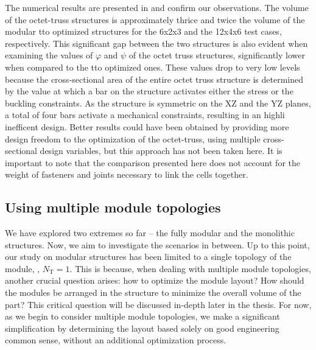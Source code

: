 The numerical results are presented in  and confirm our observations. The volume of the octet-truss structures is approximately thrice and twice the volume of the modular \gls{tto} optimized structures for the 6x2x3 and the 12x4x6 test cases, respectively. This significant gap between the two structures is also evident when examining the values of $\varphi$ and $\psi$ of the octet truss structures, significantly lower when compared to the \gls{tto} optimized ones. These values drop to very low levels because the cross-sectional area of the entire octet truss structure is determined by the value at which a bar on the structure activates either the stress or the buckling constraints. As the structure is symmetric on the XZ and the YZ planes, a total of four bars activate a mechanical constraints, resulting in an highli inefficent design. Better results could have been obtained by providing more design freedom to the optimization of the octet-truss, using multiple cross-sectional design variables, but this approach has not been taken here. It is important to note that the comparison presented here does not account for the weight of fasteners and joints necessary to link the cells together.

\subsection{Using multiple module topologies}
We have explored two extremes so far -- the fully modular and the monolithic structures. Now, we aim to investigate the scenarios in between. Up to this point, our study on modular structures has been limited to a single topology of the module, \ie, $N_\text{T}=1$. This is because, when dealing with multiple module topologies, another crucial question arises: how to optimize the module layout? How should the modules be arranged in the structure to minimize the overall volume of the part? This critical question will be discussed in-depth later in the thesis. For now, as we begin to consider multiple module topologies, we make a significant simplification by determining the layout based solely on good engineering common sense, without an additional optimization process.


